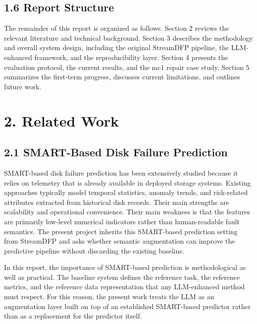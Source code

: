 \documentclass[
  11pt,
  a4paper]{article}
\begin{document}
\hypertarget{report-structure}{%
\subsection{1.6 Report Structure}\label{report-structure}}

The remainder of this report is organized as follows. Section 2 reviews
the relevant literature and technical background. Section 3 describes
the methodology and overall system design, including the original
StreamDFP pipeline, the LLM-enhanced framework, and the reproducibility
layer. Section 4 presents the evaluation protocol, the current results,
and the mc1 repair case study. Section 5 summarizes the first-term
progress, discusses current limitations, and outlines future work.

\hypertarget{related-work}{%
\section{2. Related Work}\label{related-work}}

\hypertarget{smart-based-disk-failure-prediction}{%
\subsection{2.1 SMART-Based Disk Failure
Prediction}\label{smart-based-disk-failure-prediction}}

SMART-based disk failure prediction has been extensively studied because
it relies on telemetry that is already available in deployed storage
systems. Existing approaches typically model temporal statistics,
anomaly trends, and risk-related attributes extracted from historical
disk records. Their main strengths are scalability and operational
convenience. Their main weakness is that the features are primarily
low-level numerical indicators rather than human-readable fault
semantics. The present project inherits this SMART-based prediction
setting from StreamDFP and asks whether semantic augmentation can
improve the predictive pipeline without discarding the existing
baseline.

In this report, the importance of SMART-based prediction is
methodological as well as practical. The baseline system defines the
reference task, the reference metrics, and the reference data
representation that any LLM-enhanced method must respect. For this
reason, the present work treats the LLM as an augmentation layer built
on top of an established SMART-based predictor rather than as a
replacement for the predictor itself.
\end{document}
